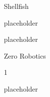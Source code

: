 
\begin{cventries}
  \cventry
    {} %
    {Shellfish} %
    {} %
    {} %
    {
      \begin{cvitems} %
        \item {placeholder}
		    \item {placeholder}
      \end{cvitems}
    }

  \cventry
    {} %
    {Zero Robotics} %
    {} %
    {} %
    {
      \begin{cvitems} %
      	\item {1}
		    \item {placeholder}
      \end{cvitems}
    }

\end{cventries}
